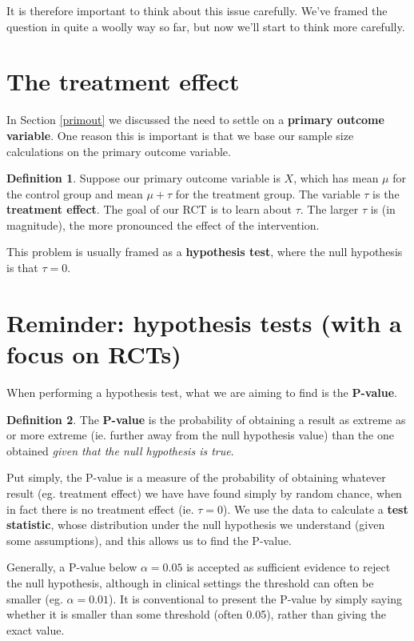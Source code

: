 \documentclass[
  openany]{book}
\theoremstyle{definition}
\newtheorem{definition}{Definition}[chapter]
\theoremstyle{definition}
\theoremstyle{definition}
\theoremstyle{definition}
\theoremstyle{remark}
\begin{document}
It is therefore important to think about this issue carefully. We've framed the question in quite a woolly way so far, but now we'll start to think more carefully.

\section{The treatment effect}\label{the-treatment-effect}

In Section \ref{primout} we discussed the need to settle on a \textbf{primary outcome variable}. One reason this is important is that we base our sample size calculations on the primary outcome variable.

\begin{definition}
Suppose our primary outcome variable is \(X\), which has mean \(\mu\) for the control group and mean \(\mu + \tau\) for the treatment group. The variable \(\tau\) is the \textbf{treatment effect}. The goal of our RCT is to learn about \(\tau\). The larger \(\tau\) is (in magnitude), the more pronounced the effect of the intervention.
\end{definition}

This problem is usually framed as a \textbf{hypothesis test}, where the null hypothesis is that \(\tau=0\).

\section{Reminder: hypothesis tests (with a focus on RCTs)}\label{reminder-hypothesis-tests-with-a-focus-on-rcts}

When performing a hypothesis test, what we are aiming to find is the \textbf{P-value}.

\begin{definition}
The \textbf{P-value} is the probability of obtaining a result as extreme as or more extreme (ie. further away from the null hypothesis value) than the one obtained \emph{given that the null hypothesis is true}.
\end{definition}

Put simply, the P-value is a measure of the probability of obtaining whatever result (eg. treatment effect) we have have found simply by random chance, when in fact there is no treatment effect (ie. \(\tau=0\)). We use the data to calculate a \textbf{test statistic}, whose distribution under the null hypothesis we understand (given some assumptions), and this allows us to find the P-value.

Generally, a P-value below \(\alpha = 0.05\) is accepted as sufficient evidence to reject the null hypothesis, although in clinical settings the threshold can often be smaller (eg. \(\alpha = 0.01\)). It is conventional to present the P-value by simply saying whether it is smaller than some threshold (often 0.05), rather than giving the exact value.
\end{document}
